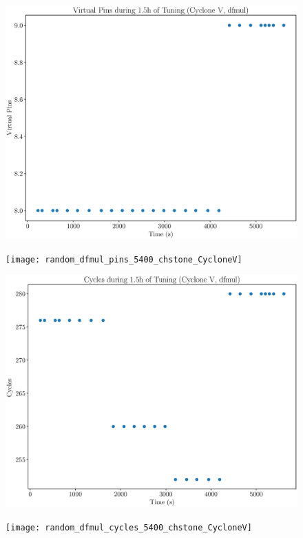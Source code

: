\documentclass[12pt, a4paper]{article}
\begin{document}
\begin{figure}[htpb]
    \begin{minipage}{.48\textwidth}
        \includegraphics[scale=.25]{dfmul_pins_5400_chstone_CycloneV}
    \end{minipage}%
    \hfill
    \begin{minipage}{.48\textwidth}
        \texttt{[image: random\_dfmul\_pins\_5400\_chstone\_CycloneV]}
    \end{minipage}%

    \begin{minipage}{.48\textwidth}
        \includegraphics[scale=.25]{dfmul_cycles_5400_chstone_CycloneV}
    \end{minipage}%
    \hfill
    \begin{minipage}{.48\textwidth}
        \texttt{[image: random\_dfmul\_cycles\_5400\_chstone\_CycloneV]}
    \end{minipage}%
\end{figure}
\end{document}
